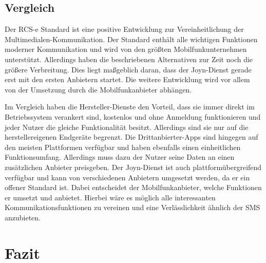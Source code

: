 \documentclass[german,12pt,a4paper]{article}
\begin{document}


 \subsection{Vergleich} %
 \label{sub:vergleich}

    Der RCS-e Standard ist eine positive Entwicklung zur Vereinheitlichung der
    Multimedialen-Kommunikation. Der Standard enthält alle wichtigen Funktionen moderner
    Kommunikation und wird von den größten Mobilfunkunternehmen unterstützt. Allerdings
    haben die beschriebenen Alternativen zur Zeit noch die größere Verbreitung. Dies liegt
    maßgeblich daran, dass der Joyn-Dienst gerade erst mit den ersten Anbietern startet. Die
    weitere Entwicklung wird vor allem von der Umsetzung durch die Mobilfunkanbieter
    abhängen.

    Im Vergleich haben die Hersteller-Dienste den Vorteil, dass sie immer direkt im Betriebssystem
    verankert sind, kostenlos und ohne Anmeldung funktionieren und jeder Nutzer die gleiche
    Funktionalität besitzt. Allerdings sind sie nur auf die herstellereigenen Endgeräte begrenzt.
    Die Drittanbierter-Apps sind hingegen auf den meisten Plattformen verfügbar und haben ebenfalls
    einen einheitlichen Funktionsumfang. Allerdings muss dazu der Nutzer seine Daten an einen
    zusätzlichen Anbieter preisgeben. Der Joyn-Dienst ist auch plattformübergreifend verfügbar und
    kann von verschiedenen Anbietern umgesetzt werden, da er ein offener Standard ist.  Dabei
    entscheidet der Mobilfunkanbieter, welche Funktionen er umsetzt und anbietet. Hierbei wäre es
    möglich alle interessanten Kommunikationsfunktionen zu vereinen und eine Verlässlichkeit ähnlich
    der SMS anzubieten.



\section{Fazit} %
\label{sec:fazit}
\end{document}
